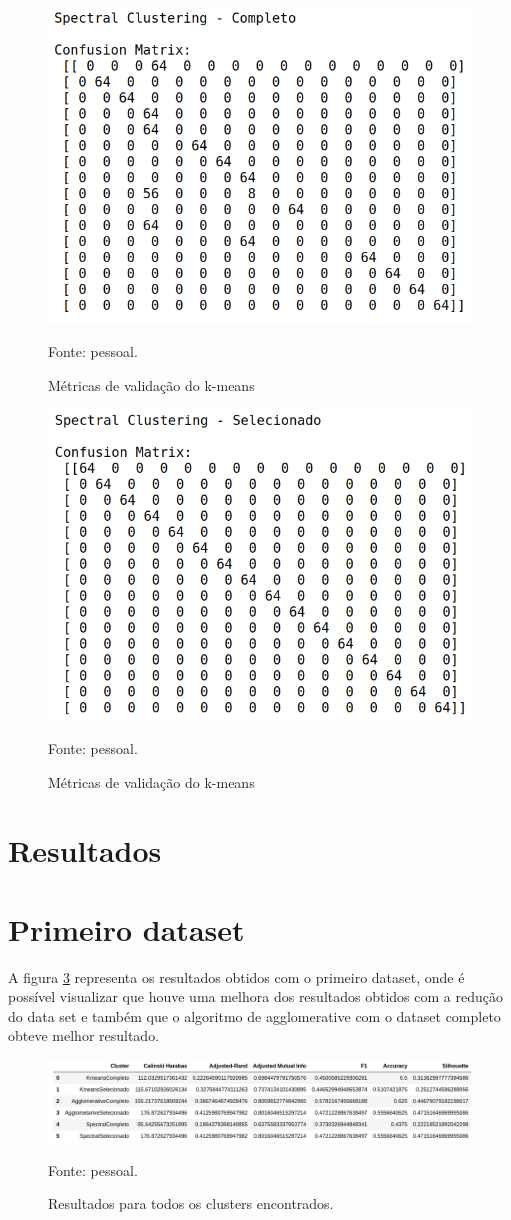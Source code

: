 \begin{figure}[h]
	\centering
	\includegraphics[width=0.7\linewidth]{images/dim128_result_spectral_completo}
	\caption{Métricas de validação do k-means}
	Fonte: pessoal.
	\label{fig:dim128_result_spectral_completo}
\end{figure}

\begin{figure}[h]
	\centering
	\includegraphics[width=0.7\linewidth]{images/dim128_result_spectral_selecionado}
	\caption{Métricas de validação do k-means}
	Fonte: pessoal.
	\label{fig:dim128_result_spectral_selecionado}
\end{figure}

\section{Resultados}

\section{Primeiro dataset}
A figura \ref{fig:resultDim032} representa os resultados obtidos com o primeiro dataset, onde é possível visualizar que houve uma melhora dos resultados obtidos com a redução do data set e também que 
o algoritmo de agglomerative com o dataset completo obteve melhor resultado.
\begin{figure}[h]
	\centering
	\includegraphics[width=0.7\linewidth]{images/result_dim032}
	\caption{Resultados para todos os clusters encontrados.}
	Fonte: pessoal.
	\label{fig:resultDim032}
\end{figure}

